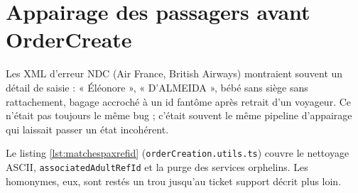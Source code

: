 \section{Appairage des passagers avant OrderCreate}

Les XML d'erreur NDC (Air France, British Airways) montraient souvent un détail de saisie : « Éléonore », « D'ALMEIDA », bébé sans siège sans rattachement, bagage accroché à un id fantôme après retrait d'un voyageur. Ce n'était pas toujours le même bug ; c'était souvent le même pipeline d'appairage qui laissait passer un état incohérent.

Le listing \ref{lst:matchespaxrefid} (\texttt{orderCreation.utils.ts}) couvre le nettoyage ASCII, \texttt{associatedAdultRefId} et la purge des services orphelins. Les homonymes, eux, sont restés un trou jusqu'au ticket support décrit plus loin.

